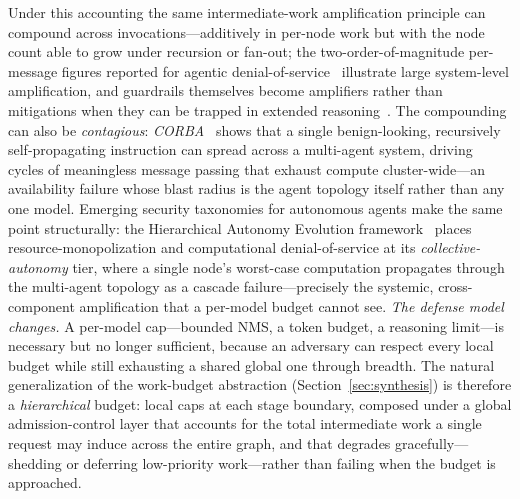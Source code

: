 \documentclass[acmsmall,screen,review,nonacm]{acmart}
\begin{document}
Under this accounting the same intermediate-work amplification principle can compound across invocations---additively in per-node work but with the node count able to grow under recursion or fan-out; the two-order-of-magnitude per-message figures reported for agentic denial-of-service~\cite{liang2026mobius,zhou2026beyondmaxtokens} illustrate large system-level amplification, and guardrails themselves become amplifiers rather than mitigations when they can be trapped in extended reasoning~\cite{zhou2026shieldtarget}. The compounding can also be \emph{contagious}: \emph{CORBA}~\cite{zhou2026corba} shows that a single benign-looking, recursively self-propagating instruction can spread across a multi-agent system, driving cycles of meaningless message passing that exhaust compute cluster-wide---an availability failure whose blast radius is the agent topology itself rather than any one model. Emerging security taxonomies for autonomous agents make the same point structurally: the Hierarchical Autonomy Evolution framework~\cite{zhang2026thinker} places resource-monopolization and computational denial-of-service at its \emph{collective-autonomy} tier, where a single node's worst-case computation propagates through the multi-agent topology as a cascade failure---precisely the systemic, cross-component amplification that a per-model budget cannot see. \emph{The defense model changes.} A per-model cap---bounded NMS, a token budget, a reasoning limit---is necessary but no longer sufficient, because an adversary can respect every local budget while still exhausting a shared global one through breadth. The natural generalization of the work-budget abstraction (Section~\ref{sec:synthesis}) is therefore a \emph{hierarchical} budget: local caps at each stage boundary, composed under a global admission-control layer that accounts for the total intermediate work a single request may induce across the entire graph, and that degrades gracefully---shedding or deferring low-priority work---rather than failing when the budget is approached.

\end{document}
